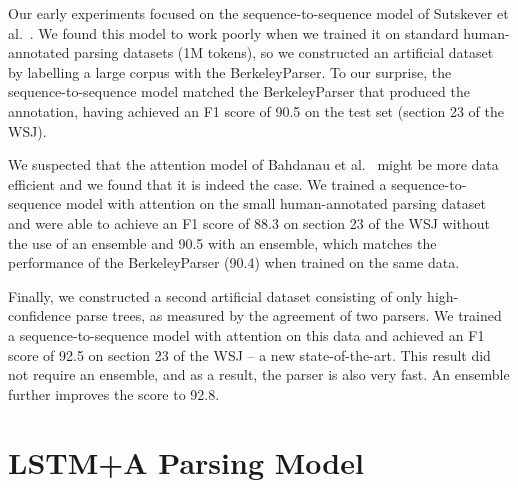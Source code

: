 \documentclass{article} \usepackage{nips15submit_e,times}
\begin{document}
Our early experiments focused on the sequence-to-sequence model of
Sutskever et al.~\cite{sutskever14}.  We found this model to work poorly
when we trained it on standard human-annotated parsing datasets (1M tokens),
so we constructed an artificial dataset by labelling a large corpus with
the BerkeleyParser.  To our surprise, the sequence-to-sequence model
matched the BerkeleyParser that produced the annotation, having
achieved an F1 score of 90.5 on the test set (section 23 of the WSJ).

We suspected that the attention model of
Bahdanau et al.~\cite{bahdanau2014neural} might be more data efficient
and we found that it is indeed the case.  We trained a sequence-to-sequence
model with attention on the small human-annotated parsing dataset and were
able to achieve an F1 score of 88.3 on section 23 of the WSJ
without the use of an ensemble and 90.5 with an ensemble, which matches
the performance of the BerkeleyParser (90.4) when trained on the same data.

Finally, we constructed a second artificial dataset consisting of only
high-confidence parse trees, as measured by the agreement of two
parsers.  We trained a sequence-to-sequence model with attention on this
data and achieved an F1 score of 92.5 on section 23 of the WSJ -- a new
state-of-the-art.  This result did not require an ensemble, and as a result,
the parser is also very fast. An ensemble further improves the score to 92.8.
 \vspace{-0mm}
\section{LSTM+A Parsing Model}
\label{sec:model}

\newcommand\cb[1]{)}
\newcommand\pair[2]{#1{}#2}
\newcommand\eos{{\small \textsc{end}}}
\end{document}
